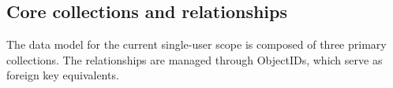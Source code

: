 \subsection{Core collections and relationships}
The data model for the current single-user scope is composed of three primary collections. The relationships are managed through ObjectIDs, which serve as foreign key equivalents.




